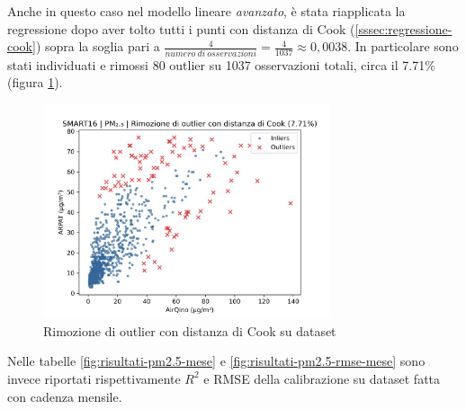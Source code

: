 Anche in questo caso nel modello lineare \textit{avanzato}, è stata riapplicata la regressione dopo aver tolto tutti i punti con distanza di Cook (\ref{sssec:regressione-cook}) sopra la soglia pari a $\frac{4}{numero\ di\ osservazioni} = \frac{4}{1037} \approx 0,0038$. In particolare sono stati individuati e rimossi 80 outlier su 1037 osservazioni totali, circa il 7.71\% (figura \ref{fig:cook-pm2.5}).

\begin{figure}[H]
\centering
\includegraphics[width=0.75\textwidth,height=\textheight,keepaspectratio]{img/cook_pm2.5.png}
\caption{Rimozione di outlier con distanza di Cook su dataset }%
\label{fig:cook-pm2.5}%
\end{figure}

Nelle tabelle \ref{fig:risultati-pm2.5-mese} e \ref{fig:risultati-pm2.5-rmse-mese} sono invece riportati rispettivamente $R^2$ e RMSE della calibrazione su dataset  fatta con cadenza mensile.

